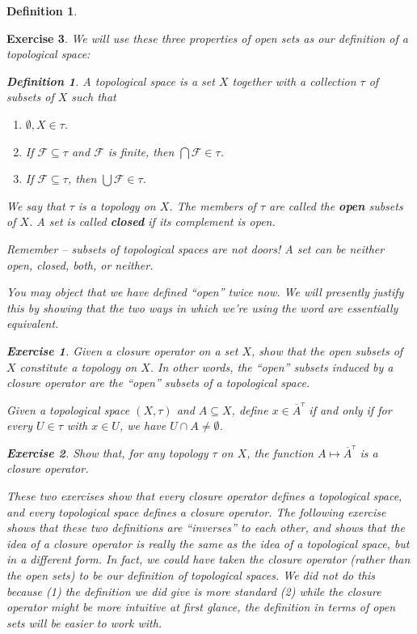 \documentclass[12pt]{amsart}
\newtheorem{exercise}{Exercise}[section]
\theoremstyle{definition}
\newtheorem{definition}[theorem]{Definition}
\theoremstyle{remark}
\newcommand{\0}{\emptyset}
\newcommand{\closure}[1]{\overline{#1}}
\newcommand{\F}{\mathcal F}
\begin{document}
\begin{definition}
\begin{exercise}
We will use these three properties of open sets as our definition of a topological space:

\begin{definition}
A topological space is a set $X$ together with a collection $\tau$ of subsets of $X$ such that
\begin{enumerate}
\item $\0, X \in \tau$.
\item If $\F \subseteq \tau$ and $\F$ is finite, then $\bigcap \F \in \tau$.
\item If $\F \subseteq \tau$, then $\bigcup \F \in \tau$.
\end{enumerate}
We say that $\tau$ is a topology on $X$. The members of $\tau$ are called the \textbf{open} subsets of $X$. A set is called \textbf{closed} if its complement is open.
\end{definition}

Remember -- subsets of topological spaces are not doors! A set can be neither open, closed, both, or neither.

You may object that we have defined ``open'' twice now. We will presently justify this by showing that the two ways in which we're using the word are essentially equivalent.

\begin{exercise}\label{ex:closureoperatortotopology}
Given a closure operator on a set $X$, show that the open subsets of $X$ constitute a topology on $X$. In other words, the ``open'' subsets induced by a closure operator are the ``open'' subsets of a topological space.
\end{exercise}

Given a topological space $(X,\tau)$ and $A \subseteq X$, define $x \in \closure{A}^\tau$ if and only if for every $U \in \tau$ with $x \in U$, we have $U \cap A \neq \0$.

\begin{exercise}\label{ex:topologytoclosureoperator}
Show that, for any topology $\tau$ on $X$, the function $A \mapsto \closure{A}^\tau$ is a closure operator.
\end{exercise}

These two exercises show that every closure operator defines a topological space, and every topological space defines a closure operator. The following exercise shows that these two definitions are ``inverses'' to each other, and shows that the idea of a closure operator is really the same as the idea of a topological space, but in a different form. In fact, we could have taken the closure operator (rather than the open sets) to be our definition of topological spaces. We did not do this because (1) the definition we did give is more standard (2) while the closure operator might be more intuitive at first glance, the definition in terms of open sets will be easier to work with.


\end{exercise}
\end{definition}
\end{document}
